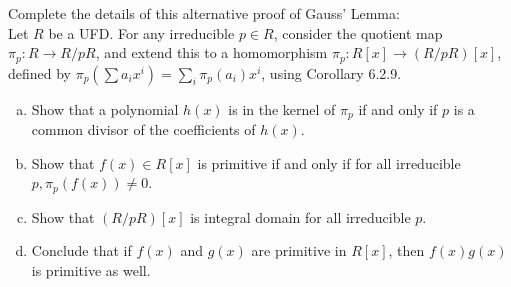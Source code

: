 \documentclass[num=1,duedate=02-03-21,course=Algebra\ II,proflastname=Walton]{hwtemplate}
\begin{document}
\problem[5]
\begin{claim}
	Complete the details of this alternative proof of Gauss' Lemma:\\

	Let \(R\) be a UFD. For any irreducible \(p \in R\), consider the quotient map \(\pi_p:R\to R / pR\), and extend this to a homomorphism \(\pi_p:R[x]\to (R / pR)[x]\), defined by \(\pi_p(\sum a_ix^{i}) = \sum_i \pi_p(a_i)x^{i}\), using Corollary 6.2.9.
	\begin{enumerate}[(a).]
		\item Show that a polynomial \(h(x)\) is in the kernel of \(\pi_p\) if and only if \(p\) is a common divisor of the coefficients of \(h(x)\).
		\item Show that \(f(x) \in R[x]\) is primitive if and only if for all irreducible \(p, \pi_p(f(x))\neq 0\).
		\item Show that \((R / pR)[x]\) is integral domain for all irreducible \(p\).
		\item Conclude that if \(f(x)\) and \(g(x)\) are primitive in \(R[x]\), then \(f(x)g(x)\) is primitive as well.
	\end{enumerate}
\end{claim}
\end{document}
